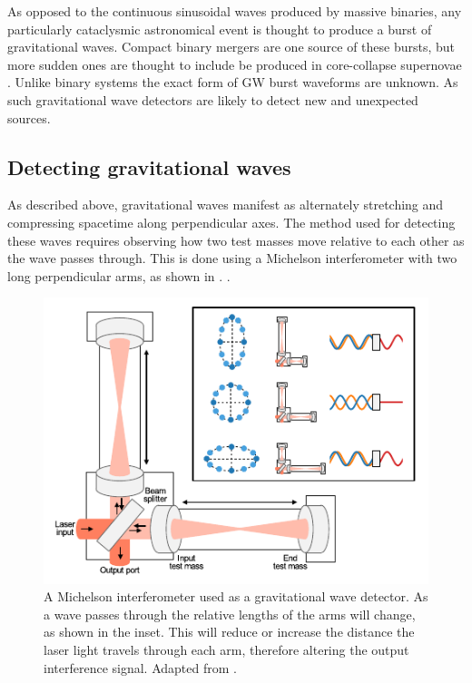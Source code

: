 \begin{colsection}
\begin{colsection}
As opposed to the continuous sinusoidal waves produced by massive binaries, any particularly cataclysmic astronomical event is thought to produce a burst of gravitational waves. Compact binary mergers are one source of these bursts, but more sudden ones are thought to include be produced in core-collapse supernovae \citep{GW-supernovae}. Unlike binary systems the exact form of GW burst waveforms are unknown. As such gravitational wave detectors are likely to detect new and unexpected sources.

\end{colsection}

\newpage
\subsection{Detecting gravitational waves}
\label{sec:gw_detecting}
\begin{colsection}

As described above, gravitational waves manifest as alternately stretching and compressing spacetime along perpendicular axes. The method used for detecting these waves requires observing how two test masses move relative to each other as the wave passes through. This is done using a Michelson interferometer with two long perpendicular arms, as shown in  \citep{BIGbirmingham}. .

\begin{figure}[t]
    \begin{center}
        \includegraphics[width=0.6\linewidth]{images/detector.pdf}
    \end{center}
    \caption[A Michelson interferometer used as a gravitational wave detector]{
        A Michelson interferometer used as a gravitational wave detector. As a wave passes through the relative lengths of the arms will change, as shown in the inset. This will reduce or increase the distance the laser light travels through each arm, therefore altering the output interference signal. Adapted from \citet{GW150914_detectors}.
        }\label{fig:detector}
\end{figure}


\end{colsection}
\end{colsection}
